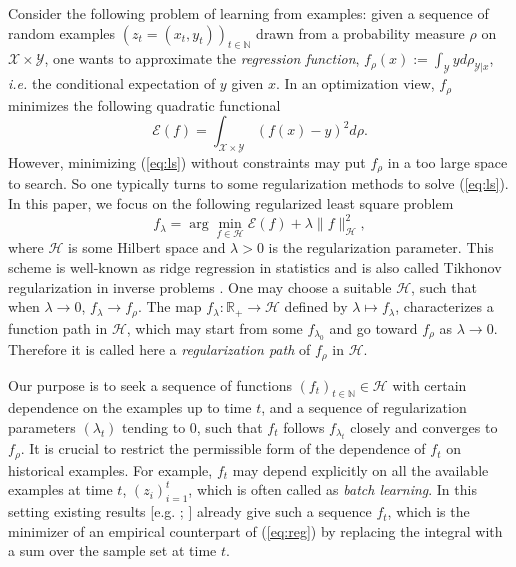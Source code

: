 \documentclass[twoside,11pt]{amsart}
\theoremstyle{theorem}
\theoremstyle{definition}
\theoremstyle{remark}
\def\R{{\mathbb R}}        %
\def\H{{\mathscr H}}
\def\X{{\mathscr X}}
\def\Y{{\mathscr Y}}
\def\Err{{\mathscr E}}
\def\N{{\mathbb N}}
\def\la{\lambda}
\begin{document}
Consider the following problem of learning from examples: given a sequence of random examples 
$(z_t=(x_t,y_t))_{t\in \N}$ drawn from a probability measure $\rho$ on $\X\times \Y$, one wants to approximate
the \emph{regression function}, $f_\rho(x):=\int_\Y y d \rho_{\Y|x}$, \emph{i.e.} the conditional expectation of $y$ given $x$. 
In an optimization view, $f_\rho$ minimizes the following quadratic functional 
\begin{equation}  \label{eq:ls}
\Err(f) = \int_{\X\times \Y} (f(x) - y)^2 d \rho.
\end{equation}
However, minimizing (\ref{eq:ls}) without constraints may put $f_\rho$ in a too large space to search. So one typically turns to 
some regularization methods to solve (\ref{eq:ls}). In this paper, we focus on the following regularized least square problem
\begin{equation}  \label{eq:reg}
f_\la = \arg \min_{f\in \H} \Err(f) + \la \|f\|_\H^2, 
\end{equation}
where $\H$ is some Hilbert space and $\la>0$ is the regularization parameter. This scheme is well-known as ridge regression in statistics
and is also called Tikhonov regularization in inverse problems \cite{EngHanNeu00}. One may choose a suitable $\H$, such that when $\la \to 0$, $f_\la \to f_\rho$. 
The map $f_\la: \R_+ \to \H$ defined by $\la\mapsto f_\la$, characterizes a function path in $\H$, which may start from some $f_{\la_0}$ and 
go toward $f_\rho$ as $\la\to 0$. Therefore it is called here a \emph{regularization path} of $f_\rho$ in $\H$. 

Our purpose is to seek a sequence of functions $(f_t)_{t\in\N}\in \H$ with certain dependence on the examples up to time $t$, 
and a sequence of regularization parameters $(\la_t)$ tending to $0$, such that $f_t$ follows $f_{\la_t}$ closely and converges to $f_\rho$. 
It is crucial to restrict the permissible form of the dependence of $f_t$ on historical examples. For example, $f_t$ may depend explicitly on 
all the available examples at time $t$, $(z_i)_{i=1}^t$, which is often called as \emph{batch learning}. In this setting existing results
[e.g. ; ] already give such a sequence $f_t$, which is the minimizer of an empirical counterpart of (\ref{eq:reg})
by replacing the integral with a sum over the sample set at time $t$. 
\end{document}
